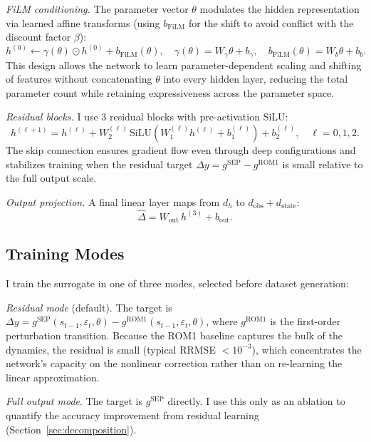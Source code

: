 \documentclass[12pt]{article}
\theoremstyle{plain}
\theoremstyle{definition}
\theoremstyle{remark}
\begin{document}
\textit{FiLM conditioning.} The parameter vector $\theta$ modulates the hidden representation via learned affine transforms (using $b_{\text{FiLM}}$ for the shift to avoid conflict with the discount factor $\beta$):
\begin{equation}
h^{(0)} \leftarrow \gamma(\theta) \odot h^{(0)} + b_{\text{FiLM}}(\theta), \quad \gamma(\theta) = W_\gamma \theta + b_\gamma, \quad b_{\text{FiLM}}(\theta) = W_b \theta + b_b.
\end{equation}
This design allows the network to learn parameter-dependent scaling and shifting of features without concatenating $\theta$ into every hidden layer, reducing the total parameter count while retaining expressiveness across the parameter space.

\textit{Residual blocks.} I use 3 residual blocks with pre-activation SiLU:
\begin{equation}
h^{(\ell+1)} = h^{(\ell)} + W_2^{(\ell)}\,\text{SiLU}(W_1^{(\ell)} h^{(\ell)} + b_1^{(\ell)}) + b_2^{(\ell)}, \quad \ell = 0, 1, 2.
\end{equation}
The skip connection ensures gradient flow even through deep configurations and stabilizes training when the residual target $\Delta y = g^{\text{SEP}} - g^{\text{ROM1}}$ is small relative to the full output scale.

\textit{Output projection.} A final linear layer maps from $d_h$ to $d_{\text{obs}} + d_{\text{state}}$:
\begin{equation}
\hat{\Delta} = W_{\text{out}}\, h^{(3)} + b_{\text{out}}.
\end{equation}


\subsection{Training Modes}
\label{app:training_modes}

I train the surrogate in one of three modes, selected before dataset generation:

\textit{Residual mode} (default). The target is $\Delta y = g^{\text{SEP}}(s_{t-1}, \varepsilon_t, \theta) - g^{\text{ROM1}}(s_{t-1}, \varepsilon_t, \theta)$, where $g^{\text{ROM1}}$ is the first-order perturbation transition. Because the ROM1 baseline captures the bulk of the dynamics, the residual is small (typical RRMSE $< 10^{-3}$), which concentrates the network's capacity on the nonlinear correction rather than on re-learning the linear approximation.

\textit{Full output mode}. The target is $g^{\text{SEP}}$ directly. I use this only as an ablation to quantify the accuracy improvement from residual learning (Section~\ref{sec:decomposition}).
\end{document}
